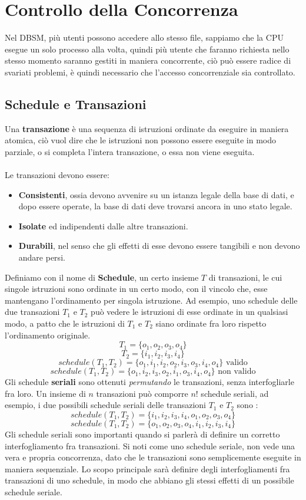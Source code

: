 \documentclass[12pt, letterpaper]{article}
\newcommand{\acc}{\\\hphantom{}\\}
\begin{document}
\section{Controllo della Concorrenza}
Nel DBSM, più utenti possono accedere allo stesso file, sappiamo che la CPU esegue un solo processo alla volta, quindi 
più utente che faranno richiesta nello stesso momento saranno gestiti in maniera concorrente, ciò può essere radice di 
svariati problemi, è quindi necessario che l'accesso concorrenziale sia controllato.\subsection{Schedule e Transazioni}
Una \textbf{transazione} è una sequenza di istruzioni ordinate da eseguire in maniera atomica, ciò vuol 
dire che le istruzioni non possono essere eseguite in modo parziale, o si completa l'intera transazione, o essa non viene 
eseguita.\acc 
Le transazioni devono essere:\begin{itemize} \item \textbf{Consistenti}, ossia devono avvenire su un istanza legale della base di dati, e dopo essere 
operate, la base di dati deve trovarsi ancora in uno stato legale.\item  \textbf{Isolate} ed 
indipendenti dalle altre transazioni. \item \textbf{Durabili}, nel senso che gli effetti di esse  devono essere 
tangibili e non devono andare persi.\end{itemize} 
Definiamo con il nome di \textbf{Schedule}, un certo insieme \(T\) di transazioni, le cui singole istruzioni sono ordinate
in un certo modo, con il vincolo che, esse mantengano l'ordinamento per singola istruzione. Ad esempio, uno schedule 
delle due transazioni \(T_1\) e \(T_2\) può vedere le istruzioni di esse ordinate in un qualsiasi modo, a patto che 
le istruzioni di \(T_1\) e \(T_2\) siano ordinate fra loro rispetto l'ordinamento originale.$$T_1 = \{o_1,o_2,o_3,o_4\}$$
$$T_2=\{i_1,i_2,i_3,i_4\}$$$$schedule(T_1,T_2)=\{o_1,i_1,i_2,o_2,i_3,o_3,i_4,o_4\} \text{ valido}$$
$$schedule(T_1,T_2)=\{o_1,i_2,i_3,o_2,i_1,o_3,i_4,o_4\} \text{ non valido}$$
Gli schedule \textbf{seriali} sono ottenuti \textit{permutando} le transazioni, senza interfogliarle fra loro. Un insieme 
di \(n\) transazioni può comporre \(n!\) schedule seriali, ad esempio, i due possibili schedule seriali delle transazioni 
\(T_1\) e \(T_2\) sono : 
$$schedule(T_1,T_2)=\{i_1,i_2,i_3,i_4,o_1,o_2,o_3,o_4\}$$
$$schedule(T_1,T_2)=\{o_1,o_2,o_3,o_4,i_1,i_2,i_3,i_4\}$$
Gli schedule seriali sono importanti quando si parlerà di definire un corretto interfogliamento fra transazioni. Si noti come 
uno schedule seriale, non vede una vera e propria concorrenza, dato che le transazioni sono semplicemente eseguite in maniera sequenziale. 
Lo scopo principale sarà definire degli interfogliamenti fra transazioni di uno schedule, in modo che abbiano gli stessi 
effetti di un possibile schedule seriale.
\end{document}
